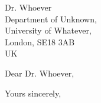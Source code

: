 \documentclass[letter]{letter}
\begin{document}
\pagestyle{firstpage}
\begin{letter}{Dr. Whoever\\Department of Unknown,\\University of Whatever,\\London, SE18 3AB\\UK}

  \address{Immanuel Kant (Dr.)\\
    K\"{o}nigsberg, Prussia\\
    German}
  \signature{Immanuel Kant}
  \date{\today}

  \opening{Dear Dr. Whoever,}
  \kant[1-2]
  \closing{Yours sincerely,}
\end{letter}
\end{document}
